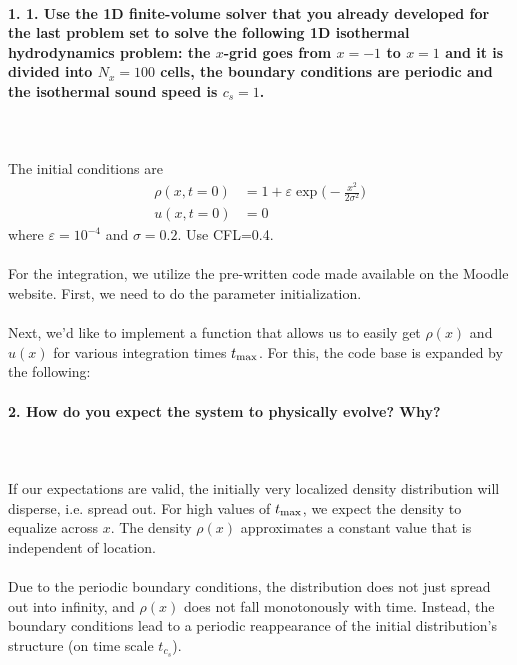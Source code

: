 \paragraph{1. 1. Use the 1D finite-volume solver that you 
    already developed for the last problem set to solve 
    the following 1D isothermal hydrodynamics problem: the 
    $x$-grid goes from $x=-1$ to $x=1$ and it is divided 
    into $N_x=100$ cells, the boundary conditions are 
    periodic and the isothermal sound speed is $c_s=1$. 
} \ \\
    \\
    The initial conditions are 
    \begin{align}
        \rho(x, t=0)
        &=1+\varepsilon\exp\bigg(
            -\frac{x^2}{2\sigma^2}
        \bigg) \\
        u(x,t=0)
        &=0
    \end{align}
    where $\varepsilon=10^{-4}$ and $\sigma=0.2$. 
    Use CFL=0.4. \\
    \\
    For the integration, we utilize the pre-written 
    code made available on the Moodle website. First, we 
    need to do the parameter initialization. \\
     \ \\
    Next, we'd like to implement a function that allows us 
    to easily get $\rho(x)$ and $u(x)$ for various 
    integration times $t_\textnormal{max}$. For this, the 
    code base is expanded by the following: \\
    

\paragraph{2. How do you expect the system to physically 
    evolve? Why?
} \ \\
    \\
    If our expectations are valid, the initially very
    localized density distribution will disperse, i.e. 
    spread out. For high values of $t_\textnormal{max}$, 
    we expect the density to equalize across $x$. The 
    density $\rho(x)$ approximates a constant value that 
    is independent of location. \\
    \\
    Due to the periodic boundary conditions, the 
    distribution does not just spread out into 
    infinity, and $\rho(x)$ does not fall monotonously
    with time. Instead, the boundary conditions lead to 
    a periodic reappearance of the initial distribution's
    structure (on time scale $t_{c_s}$).

